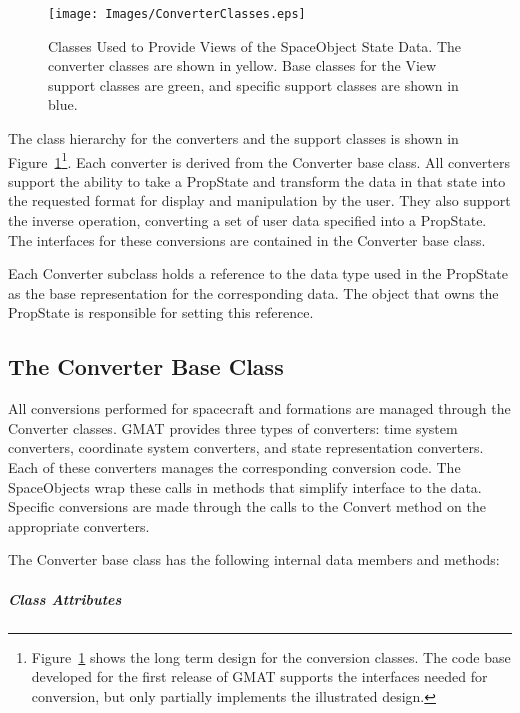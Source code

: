 \begin{figure}[htb]
\begin{center}
\texttt{[image: Images/ConverterClasses.eps]}
\caption[Classes Used to Provide Views of the SpaceObject State
Data]{\label{figure:SpaceObjectMVCClasses}Classes Used to Provide Views of the SpaceObject
State Data.  The converter classes are shown in yellow.  Base classes for the View support classes
are green, and specific support classes are shown in blue.}
\end{center}
\end{figure}

The class hierarchy for the converters and the support classes is shown in
Figure~\ref{figure:SpaceObjectMVCClasses}\footnote{Figure~\ref{figure:SpaceObjectMVCClasses} shows
the long term design for the conversion classes.  The code base developed for the first release of
GMAT supports the interfaces needed for conversion, but only partially implements the illustrated
design.}.  Each converter is derived from the Converter base class.  All converters support the
ability to take a PropState and transform the data in that state into the requested format for
display and manipulation by the user.  They also support the inverse operation, converting a set of
user data specified into a PropState.  The interfaces for these conversions are contained in the
Converter base class.

Each Converter subclass holds a reference to the data type used in the PropState as the base
representation for the corresponding data.  The object that owns the PropState is responsible for
setting this reference.

\subsection{The Converter Base Class}

All conversions performed for spacecraft and formations are managed through the Converter classes.
GMAT provides three types of converters: time system converters, coordinate system converters, and
state representation converters.  Each of these converters manages the corresponding conversion
code.  The SpaceObjects wrap these calls in methods that simplify interface to the data.  Specific
conversions are made through the calls to the Convert method on the appropriate converters.

The Converter base class has the following internal data members and methods:

\subparagraph{\textit{Class Attributes}}

